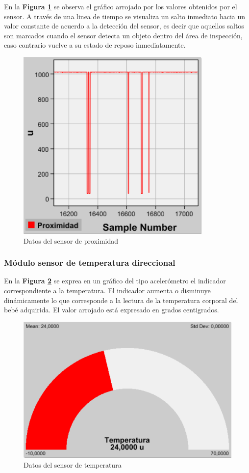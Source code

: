 \documentclass{IEEEtran}
\begin{document}
				En la \textbf{Figura \ref{proximidad}} se observa el gráfico arrojado por los valores obtenidos por el sensor. A través de una linea de tiempo se visualiza un salto inmediato hacia un valor constante de acuerdo a la detección del sensor, es decir que aquellos saltos son marcados cuando el sensor detecta un objeto dentro del área de inspección, caso contrario vuelve a su estado de reposo inmediatamente.
				\begin{figure}
					\centering
					\includegraphics[width=0.6\linewidth]{proximidad}
					\caption{Datos del sensor de proximidad}
					\label{proximidad}
				\end{figure}

			\subsubsection{Módulo sensor de temperatura direccional}

				En la \textbf{Figura \ref{temperatura}} se exprea en un gráfico del tipo acelerómetro el indicador correspondiente a la temperatura. El indicador aumenta o disminuye dinámicamente lo que corresponde a la lectura de la temperatura corporal del bebé adquirida. El valor arrojado está expresado en grados centigrados.

				\begin{figure}
					\centering
					\includegraphics[width=0.7\linewidth]{temperatura}
					\caption{Datos del sensor de temperatura}
					\label{temperatura}
				\end{figure}
\end{document}
